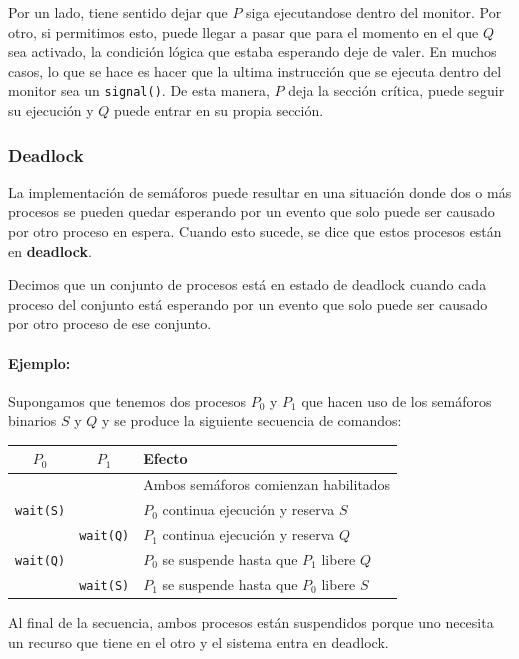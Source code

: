 Por un lado, tiene sentido dejar que $P$ siga ejecutandose dentro del monitor. Por otro, si permitimos esto, puede llegar a pasar que para el momento en el que $Q$ sea activado, la condición lógica que estaba esperando deje de valer. En muchos casos, lo que se hace es hacer que la ultima instrucción que se ejecuta dentro del monitor sea un \texttt{signal()}. De esta manera, $P$ deja la sección crítica, puede seguir su ejecución y $Q$ puede entrar en su propia sección.

\subsubsection{Deadlock}
La implementación de semáforos puede resultar en una situación donde dos o más procesos se pueden quedar esperando por un evento que solo puede ser causado por otro proceso en espera.  Cuando esto sucede, se dice que estos procesos están en \textbf{deadlock}.

Decimos que un conjunto de procesos está en estado de deadlock cuando cada proceso del conjunto está esperando por un evento que solo puede ser causado por otro proceso de ese conjunto.

\paragraph{Ejemplo:} Supongamos que tenemos dos procesos $P_0$ y $P_1$ que hacen uso de los semáforos binarios $S$ y $Q$ y se produce la siguiente secuencia de comandos:

\begin{center}
\begin{tabularx}{0.8\textwidth}{|C{0.5}|C{0.5}|L{2}|}
    \hline 
    \textbf{$P_0$} & \textbf{$P_1$} & Efecto \\
    \hline
    & & Ambos semáforos comienzan habilitados \\
    \hline
    \texttt{wait(S)} & & $P_0$ continua ejecución y reserva $S$\\
    \hline
     & \texttt{wait(Q)} & $P_1$ continua ejecución y reserva $Q$ \\
    \hline
    \texttt{wait(Q)}  & & $P_0$ se suspende hasta que $P_1$ libere $Q$ \\	
    \hline
     & \texttt{wait(S)} &  $P_1$ se suspende hasta que $P_0$ libere $S$\\	
    \hline
\end{tabularx}
 \end{center}
Al final de la secuencia, ambos procesos están suspendidos porque uno necesita un recurso que tiene en el otro y el sistema entra en deadlock.

